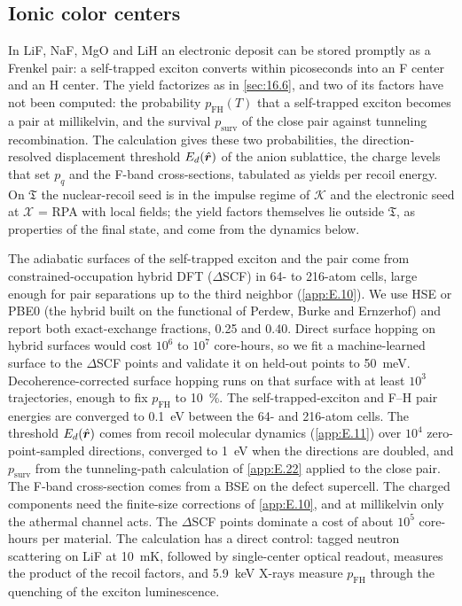 \subsection{Ionic color centers}

In LiF, NaF, MgO and LiH an electronic deposit can be stored promptly as a Frenkel pair: a self-trapped exciton converts within picoseconds into an F center and an H center. The yield factorizes as in \cref{sec:16.6}, and two of its factors have not been computed: the probability $p_{\mathrm{FH}}(T)$ that a self-trapped exciton becomes a pair at millikelvin, and the survival $p_{\mathrm{surv}}$ of the close pair against tunneling recombination. The calculation gives these two probabilities, the direction-resolved displacement threshold $E_d(\hat{\bm{r}})$ of the anion sublattice, the charge levels that set $p_q$ and the F-band cross-sections, tabulated as yields per recoil energy. On $\mathfrak{T}$ the nuclear-recoil seed is in the impulse regime of $\mathcal{K}$ and the electronic seed at $\mathcal{X}$ = RPA with local fields; the yield factors themselves lie outside $\mathfrak{T}$, as properties of the final state, and come from the dynamics below.

The adiabatic surfaces of the self-trapped exciton and the pair come from constrained-occupation hybrid DFT ($\Delta$SCF) in 64- to 216-atom cells, large enough for pair separations up to the third neighbor (\cref{app:E.10}). We use HSE or PBE0 (the hybrid built on the functional of Perdew, Burke and Ernzerhof) and report both exact-exchange fractions, 0.25 and 0.40. Direct surface hopping on hybrid surfaces would cost $10^6$ to $10^7$ core-hours, so we fit a machine-learned surface to the $\Delta$SCF points and validate it on held-out points to \SI{50}{meV}. Decoherence-corrected surface hopping runs on that surface with at least $10^3$ trajectories, enough to fix $p_{\mathrm{FH}}$ to \SI{10}{\percent}. The self-trapped-exciton and F--H pair energies are converged to \SI{0.1}{eV} between the 64- and 216-atom cells. The threshold $E_d(\hat{\bm{r}})$ comes from recoil molecular dynamics (\cref{app:E.11}) over $10^4$ zero-point-sampled directions, converged to \SI{1}{eV} when the directions are doubled, and $p_{\mathrm{surv}}$ from the tunneling-path calculation of \cref{app:E.22} applied to the close pair. The F-band cross-section comes from a BSE on the defect supercell. The charged components need the finite-size corrections of \cref{app:E.10}, and at millikelvin only the athermal channel acts. The $\Delta$SCF points dominate a cost of about $10^5$ core-hours per material. The calculation has a direct control: tagged neutron scattering on LiF at \SI{10}{mK}, followed by single-center optical readout, measures the product of the recoil factors, and \SI{5.9}{keV} X-rays measure $p_{\mathrm{FH}}$ through the quenching of the exciton luminescence.

